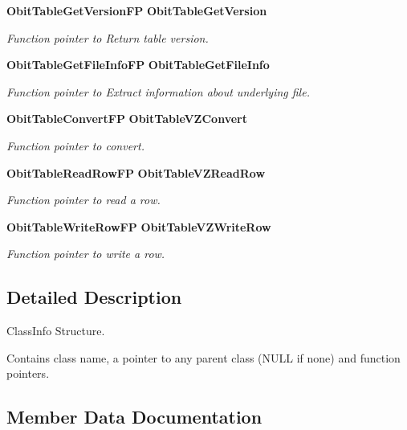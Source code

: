 \begin{CompactItemize}
{\bf Obit\-Table\-Get\-Version\-FP} {\bf Obit\-Table\-Get\-Version}
\begin{CompactList}\small\item\em Function pointer to Return table version. \item\end{CompactList}\item 
{\bf Obit\-Table\-Get\-File\-Info\-FP} {\bf Obit\-Table\-Get\-File\-Info}
\begin{CompactList}\small\item\em Function pointer to Extract information about underlying file. \item\end{CompactList}\item 
{\bf Obit\-Table\-Convert\-FP} {\bf Obit\-Table\-VZConvert}
\begin{CompactList}\small\item\em Function pointer to convert. \item\end{CompactList}\item 
{\bf Obit\-Table\-Read\-Row\-FP} {\bf Obit\-Table\-VZRead\-Row}
\begin{CompactList}\small\item\em Function pointer to read a row. \item\end{CompactList}\item 
{\bf Obit\-Table\-Write\-Row\-FP} {\bf Obit\-Table\-VZWrite\-Row}
\begin{CompactList}\small\item\em Function pointer to write a row. \item\end{CompactList}\end{CompactItemize}


\subsection{Detailed Description}
Class\-Info Structure. 

Contains class name, a pointer to any parent class (NULL if none) and function pointers. 



\subsection{Member Data Documentation}
